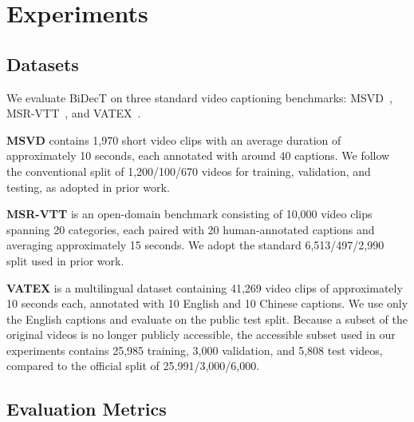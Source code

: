 \section{Experiments}
\label{sec:05_exp}

\subsection{Datasets}
\label{subsec:subsec_51_datasets}
We evaluate BiDecT on three standard video captioning benchmarks: MSVD~\cite{chenCollectingHighlyParallel2011}, MSR-VTT~\cite{xuMSRVTTLargeVideo2016}, and VATEX~\cite{wangVaTeXLargeScaleHighQuality2019}.

\textbf{MSVD} contains 1,970 short video clips with an average duration of approximately 10 seconds, each annotated with around 40 captions. We follow the conventional split of 1,200/100/670 videos for training, validation, and testing, as adopted in prior work.

\textbf{MSR-VTT} is an open-domain benchmark consisting of 10,000 video clips spanning 20 categories, each paired with 20 human-annotated captions and averaging approximately 15 seconds. We adopt the standard 6,513/497/2,990 split used in prior work.

\textbf{VATEX} is a multilingual dataset containing 41,269 video clips of approximately 10 seconds each, annotated with 10 English and 10 Chinese captions. We use only the English captions and evaluate on the public test split. Because a subset of the original videos is no longer publicly accessible, the accessible subset used in our experiments contains 25,985 training, 3,000 validation, and 5,808 test videos, compared to the official split of 25,991/3,000/6,000.



\subsection{Evaluation Metrics}
\label{subsec:subsec_52_metrics}


